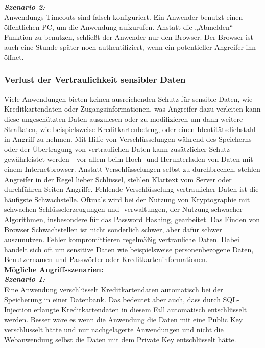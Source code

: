 \textbf{\textit{Szenario 2:}}\\
 Anwendungs-Timeouts sind falsch konfiguriert. Ein Anwender benutzt einen öffentlichen PC, um die Anwendung aufzurufen. Anstatt die „Abmelden“-Funktion zu benutzen, schließt der Anwender nur den Browser. Der Browser ist auch eine Stunde später noch authentifiziert, wenn ein potentieller Angreifer ihn öffnet\cite[8]{owasp17top10}.\\

\subsubsection{Verlust der Vertraulichkeit sensibler Daten}

Viele Anwendungen bieten keinen ausreichenden Schutz für sensible Daten, wie Kreditkartendaten oder Zugangsinformationen, was Angreifer dazu verleiten kann diese ungeschützten Daten auszulesen oder zu modifizieren um dann weitere Straftaten, wie beispielsweise Kreditkartenbetrug, oder einen Identitätsdiebstahl in Angriff zu nehmen. Mit  Hilfe von Verschlüsselungen während des Speicherns oder der Übertragung von vertraulichen Daten kann zusätzlicher Schutz gewährleistet werden - vor allem beim Hoch- und Herunterladen von Daten mit einem Internetbrowser\cite[6]{owasp17top10}. Anstatt Verschlüsselungen selbst zu durchbrechen, stehlen Angreifer in der Regel lieber Schlüssel, stehlen Klartext vom Server oder durchführen Seiten-Angriffe. Fehlende Verschlüsselung vertraulicher Daten ist die häufigste Schwachstelle. Oftmals wird bei der Nutzung von Kryptographie mit schwachen Schlüsselerzeugungen und -verwaltungen, der Nutzung schwacher Algorithmen, insbesondere für das Password Hashing, gearbeitet. Das Finden von Browser Schwachstellen ist nicht sonderlich schwer, aber dafür schwer auszunutzen. Fehler kompromittieren regelmäßig vertrauliche Daten. Dabei handelt sich oft um sensitive Daten wie beispielsweise personenbezogene Daten, Benutzernamen und Passwörter oder Kreditkarteninformationen\cite[9]{owasp17top10}.\\

\textbf{Mögliche Angriffsszenarien:}\\

\textbf{\textit{Szenario 1:}}\\

Eine Anwendung verschlüsselt Kreditkartendaten automatisch bei der Speicherung in einer Datenbank. Das bedeutet aber auch, dass durch SQL-Injection erlangte Kreditkartendaten in diesem Fall automatisch entschlüsselt werden. Besser wäre es wenn die Anwendung die Daten mit eine Public Key
verschlüsselt hätte und nur nachgelagerte Anwendungen und nicht die Webanwendung selbst die Daten mit dem Private Key entschlüsselt hätte\cite[9]{owasp17top10}.\\

